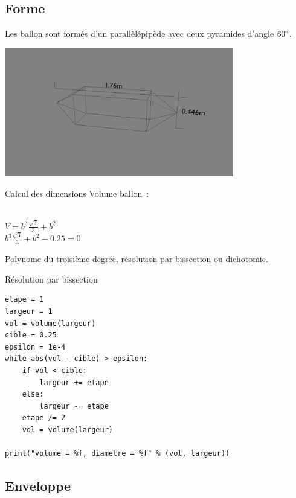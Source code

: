 \documentclass{beamer}
\begin{document}
\subsection{Forme}

\begin{frame}
  Les ballon sont formés d'un parallèlépipède avec deux pyramides d'angle $60\degree$. \\
  \begin{center}
    \includegraphics[width=10cm]{../Images/ballon.png}
  \end{center}
\end{frame}

\begin{frame}{Calcul des dimensions}
  Volume ballon~:
  \begin{center}
     \\
    $\displaystyle{V = b^3 \frac{\sqrt{3}}{3} + b^2}$ \\
    $\displaystyle{b^3 \frac{\sqrt{3}}{3} + b^2 - 0.25 = 0}$
  \end{center}
  Polynome du troisième degrée, résolution par bissection ou dichotomie.
\end{frame}

\begin{frame}[fragile]{Résolution par bissection}
  \begin{lstlisting}[frame=single]
etape = 1
largeur = 1
vol = volume(largeur)
cible = 0.25
epsilon = 1e-4
while abs(vol - cible) > epsilon:
	if vol < cible:
		largeur += etape
	else:
		largeur -= etape
	etape /= 2
	vol = volume(largeur)

print("volume = %f, diametre = %f" % (vol, largeur))
  \end{lstlisting}
\end{frame}

\subsection{Enveloppe}
\end{document}
